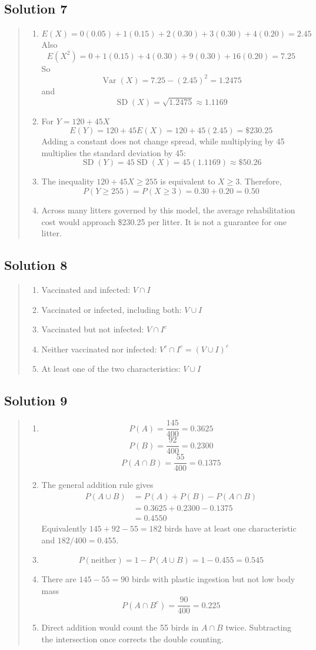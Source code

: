 \documentclass[10pt,letterpaper]{article}
\newcommand{\solutionheading}[1]{%
  \subsection*{Solution #1}
}
\newenvironment{answer}{%
  \begin{quote}\small\color{black}
}{%
  \end{quote}
}
\begin{document}
\solutionheading{7}
\begin{answer}
\begin{enumerate}
	\item
	$$E(X)=0(0.05)+1(0.15)+2(0.30)+3(0.30)+4(0.20)=2.45$$
  	Also
	$$E(X^2)=0+1(0.15)+4(0.30)+9(0.30)+16(0.20)=7.25$$
	So 
	$$\operatorname{Var}(X)=7.25-(2.45)^2=1.2475$$
  	and
	$$\operatorname{SD}(X)=\sqrt{1.2475}\approx1.1169$$
 	 \item For $Y=120+45X$
	$$E(Y)=120+45E(X)=120+45(2.45)=\$230.25$$
  	Adding a constant does not change spread, while multiplying by 45 multiplies the standard deviation by 45:
	$$\operatorname{SD}(Y)=45\operatorname{SD}(X)=45(1.1169)\approx\$50.26$$
  	\item The inequality $120+45X\geq255$ is equivalent to $X\geq3$. Therefore,
	$$P(Y\geq255)=P(X\geq3)=0.30+0.20=0.50$$
	\item Across many litters governed by this model, the average rehabilitation cost would approach \$230.25 per litter. It is not a guarantee for one litter.
\end{enumerate}
\end{answer}

\solutionheading{8}
\begin{answer}
\begin{enumerate}
	\item Vaccinated and infected: $V\cap I$
  	\item Vaccinated or infected, including both: $V\cup I$
  	\item Vaccinated but not infected: $V\cap I^c$
  	\item Neither vaccinated nor infected: $V^c\cap I^c=(V\cup I)^c$
	\item At least one of the two characteristics: $V\cup I$
\end{enumerate}
\end{answer}

\solutionheading{9}
\begin{answer}
\begin{enumerate}
	\item 
	$$P(A)=\frac{145}{400}=0.3625$$
 	$$P(B)=\frac{92}{400}=0.2300$$
	$$P(A\cap B)=\frac{55}{400}=0.1375$$
  	\item The general addition rule gives
	$$
  	\begin{aligned}
  	P(A\cup B)
  	&=P(A)+P(B)-P(A\cap B)\\
  	&=0.3625+0.2300-0.1375\\
  	&=0.4550
  	\end{aligned}
	$$
  	Equivalently $145+92-55=182$ birds have at least one characteristic and $182/400=0.455$.
  	\item
	$$P(\text{neither})=1-P(A\cup B)=1-0.455=0.545$$
	\item There are $145-55=90$ birds with plastic ingestion but not low body mass
	$$P(A\cap B^c)=\frac{90}{400}=0.225$$
  	\item Direct addition would count the 55 birds in $A\cap B$ twice. Subtracting the intersection once corrects the double counting.
\end{enumerate}
\end{answer}
\end{document}
